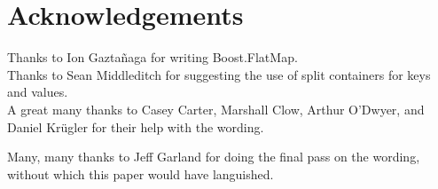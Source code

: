 \section{Acknowledgements}

Thanks to Ion Gazta{\~n}aga for writing Boost.FlatMap.\\

Thanks to Sean Middleditch for suggesting the use of split containers for keys
and values.\\

A great many thanks to Casey Carter, Marshall Clow, Arthur O'Dwyer, and Daniel Kr{\"u}gler for their help with the wording.

Many, many thanks to Jeff Garland for doing the final pass on the wording,
without which this paper would have languished.
